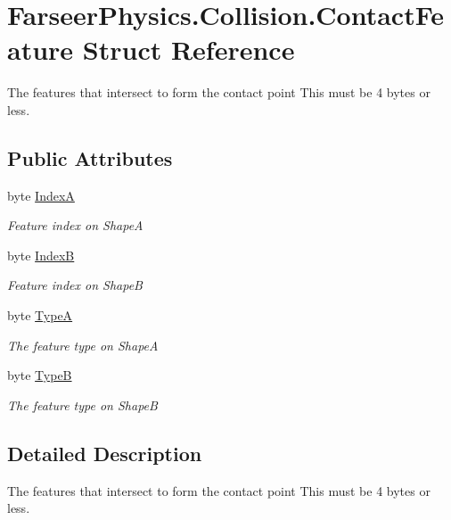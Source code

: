 \hypertarget{struct_farseer_physics_1_1_collision_1_1_contact_feature}{\section{Farseer\+Physics.\+Collision.\+Contact\+Feature Struct Reference}
\label{struct_farseer_physics_1_1_collision_1_1_contact_feature}
}


The features that intersect to form the contact point This must be 4 bytes or less.  


\subsection*{Public Attributes}
\begin{DoxyCompactItemize}
\item 
byte \hyperlink{struct_farseer_physics_1_1_collision_1_1_contact_feature_a78a2275506344a677783d3e4bc8883f9}{Index\+A}
\begin{DoxyCompactList}\small\item\em Feature index on Shape\+A \end{DoxyCompactList}\item 
byte \hyperlink{struct_farseer_physics_1_1_collision_1_1_contact_feature_aa852c5cf1a63b2a34e06e739f817e843}{Index\+B}
\begin{DoxyCompactList}\small\item\em Feature index on Shape\+B \end{DoxyCompactList}\item 
byte \hyperlink{struct_farseer_physics_1_1_collision_1_1_contact_feature_a4a06d6049831cf29449d3e280ff9b853}{Type\+A}
\begin{DoxyCompactList}\small\item\em The feature type on Shape\+A \end{DoxyCompactList}\item 
byte \hyperlink{struct_farseer_physics_1_1_collision_1_1_contact_feature_a8709a56713996072bdddb2d3a8ee5dcf}{Type\+B}
\begin{DoxyCompactList}\small\item\em The feature type on Shape\+B \end{DoxyCompactList}\end{DoxyCompactItemize}


\subsection{Detailed Description}
The features that intersect to form the contact point This must be 4 bytes or less. 




